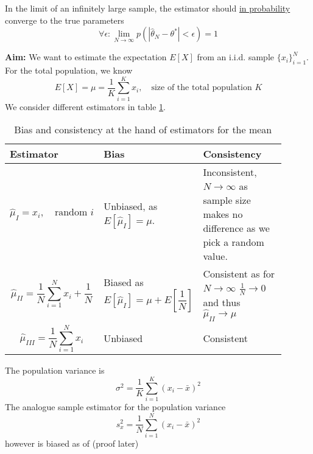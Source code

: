 In the limit of an infinitely large sample, the
estimator should \underline{in probability} converge to the
true parameters
\begin{equation}
    \forall \epsilon: \lim_{N \rightarrow \infty} p(|\hat{\theta}_N - \theta^*| < \epsilon) = 1
\end{equation}

\textbf{Aim:} We want to estimate the expectation $E[X]$ from an i.i.d. sample
$\{x_i\}_{i=1}^N$. For the total population, we know
\begin{equation}
    E[X] = \mu = \frac{1}{K} \sum_{i=1}^{K} x_i, \quad \text{size of the total population } K
\end{equation}
We consider different estimators in table \ref{tab:bias_consist}.

\begin{table}
    \centering
    \begin{tabular}{|p{0.3\linewidth}|p{0.3\linewidth}|p{0.3\linewidth}|}
        \hline \textcolor{blue1}{Estimator} & \textcolor{blue1}{Bias} & \textcolor{blue1}{Consistency} \\
        \hline
        $$\hat{\mu}_I=x_i, \quad \text{random } i$$ 
        &
        Unbiased, as $E\left[\hat{\mu}_I\right]=\mu$. &
        Inconsistent, $N \rightarrow \infty$ as
        sample size makes no
        difference as we pick a 
        random value. \\
        \hline
        $$\hat{\mu}_{I I}=\frac{1}{N} \sum_{i=1}^N x_i+\frac{1}{N}$$ &
        Biased as
        $$E\left[\hat{\mu}_I\right]=\mu+E\left[\frac{1}{N}\right]$$
        &
        Consistent as for $N \rightarrow \infty$
        $\frac{1}{N} \rightarrow 0$ and thus $\hat{\mu}_{I I} \rightarrow \mu$
        \\
        \hline
        $$\hat{\mu}_{I I I}=\frac{1}{N} \sum_{i=1}^N x_i$$ & Unbiased & Consistent \\
        \hline
    \end{tabular}
    \caption{Bias and consistency at the hand of estimators for the mean}
    \label{tab:bias_consist}
\end{table}

The population variance is
\begin{equation}
    \sigma^2=\frac{1}{K} \sum_{i=1}^K\left(x_i-\bar{x}\right)^2
\end{equation}
The analogue sample estimator for the population variance
\begin{equation}
    s_x^2=\frac{1}{N} \sum_{i=1}^N\left(x_i-\bar{x}\right)^2
\end{equation}
however is biased as of (proof later)

